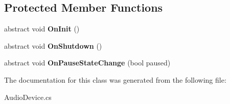 \subsection*{Protected Member Functions}
\begin{DoxyCompactItemize}
\item 
\hypertarget{class_eimu_1_1_core_1_1_systems_1_1_s_chip8_1_1_audio_device_abf299f5d06f254308c7d150ea0d04c55}{
abstract void {\bfseries OnInit} ()}
\label{class_eimu_1_1_core_1_1_systems_1_1_s_chip8_1_1_audio_device_abf299f5d06f254308c7d150ea0d04c55}

\item 
\hypertarget{class_eimu_1_1_core_1_1_systems_1_1_s_chip8_1_1_audio_device_aa4aeb6770c2a1356baaf01e4164906d7}{
abstract void {\bfseries OnShutdown} ()}
\label{class_eimu_1_1_core_1_1_systems_1_1_s_chip8_1_1_audio_device_aa4aeb6770c2a1356baaf01e4164906d7}

\item 
\hypertarget{class_eimu_1_1_core_1_1_systems_1_1_s_chip8_1_1_audio_device_a299ba3feda5c88bb8033458cd6588c26}{
abstract void {\bfseries OnPauseStateChange} (bool paused)}
\label{class_eimu_1_1_core_1_1_systems_1_1_s_chip8_1_1_audio_device_a299ba3feda5c88bb8033458cd6588c26}

\end{DoxyCompactItemize}


The documentation for this class was generated from the following file:\begin{DoxyCompactItemize}
\item 
AudioDevice.cs\end{DoxyCompactItemize}
